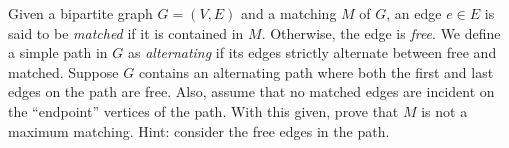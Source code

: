 Given a bipartite graph $G=(V,E)$ and a matching $M$ of $G$, an edge $e\in  E$
is said to be {\em matched} if it is contained in $M$.  Otherwise, the edge is
{\em free}.  We define a simple path in $G$ as {\em alternating} if
its edges strictly alternate between free and matched.  Suppose $G$ 
contains an alternating path where both the first and last edges on the path 
are
free.  Also, assume that no matched edges are incident on the ``endpoint'' 
vertices of the path.  With this given, prove that
$M$ is not a maximum matching.  Hint: consider the free edges in the
path.
